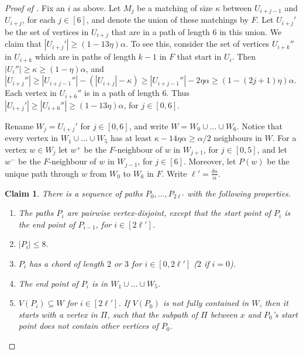 \documentclass[11pt,english]{article}
\theoremstyle{plain}
\newtheorem{claim}[theorem]{Claim}
\theoremstyle{definition}
\theoremstyle{remark}
\def \wm {w^-}
\def \wp {w^+}
\begin{document}
\begin{proof}[Proof of ]
			Fix an $i$ as above. Let $M_j$ be a matching of size $\kappa$ between $U_{i+j-1}$ and $U_{i+j}$, for each $j \in [6]$, and denote the union of these matchings by $F$. Let $U_{i+j}'$ be the set of vertices in $U_{i+j}$ that are in a path of length $6$ in this union. We claim that $|U_{i+j}'| \ge (1 - 13\eta)\alpha$. To see this, consider the set of vertices $U_{i+k}''$ in $U_{i+k}$ which are in paths of length $k-1$ in $F$ that start in $U_{i}$. Then $|U_i''| \ge \kappa \ge (1 - \eta)\alpha$, and $|U_{i+j}''| \ge |U_{i+j-1}''| - (|U_{i+j}| - \kappa) \ge |U_{i+j-1}''| - 2\eta \alpha \ge (1 - (2j+1)\eta)\alpha$. Each vertex in $U_{i+6}''$ is in a path of length $6$. Thus $|U_{i+j}'| \ge |U_{i+6}''| \ge (1 - 13\eta)\alpha$, for $j \in [0,6]$. 

			Rename $W_j = U_{i+j}'$ for $j \in [0, 6]$, and write $W = W_0 \cup \ldots \cup W_6$. Notice that every vertex in $W_1 \cup \ldots \cup W_5$ has at least $\kappa - 14\eta\alpha \ge \alpha/2$ neighbours in $W$.
			For a vertex $w \in W_j$ let $\wp$ be the $F$-neighbour of $w$ in $W_{j+1}$, for $j \in [0,5]$, and let $\wm$ be the $F$-neighbour of $w$ in $W_{j-1}$, for $j \in [6]$. Moreover, let $P(w)$ be the unique path through $w$ from $W_0$ to $W_6$ in $F$.
			Write $\ell' = \frac{\delta n}{\alpha}$.
			\begin{claim}
				There is a sequence of paths $P_0, \ldots, P_{2\ell'}$ with the following properties.
				\begin{enumerate}[label = \rm(\alph*)]
					\item \label{itm:n-alpha-disj}
						The paths $P_i$ are pairwise vertex-disjoint, except that the start point of $P_{i}$ is the end point of $P_{i-1}$, for $i \in [2\ell']$.
					\item \label{itm:n-alpha-len}
						$|P_i| \le 8$.
					\item \label{itm:n-alpha-chord}
						$P_i$ has a chord of length $2$ or $3$ for $i \in [0,2\ell']$ ($2$ if $i = 0$).
					\item \label{itm:n-alpha-end}
						The end point of $P_i$ is in $W_1 \cup \ldots \cup W_5$.
					\item \label{itm:n-alpha-W}
						$V(P_i) \subseteq W$ for $i \in [2\ell']$. If $V(P_0)$ is not fully contained in $W$, then it starts with a vertex in $\Pi$, such that the subpath of $\Pi$ between $x$ and $P_0$'s start point does not contain other vertices of $P_0$.
				\end{enumerate}
			\end{claim}


\end{proof}
\end{document}
